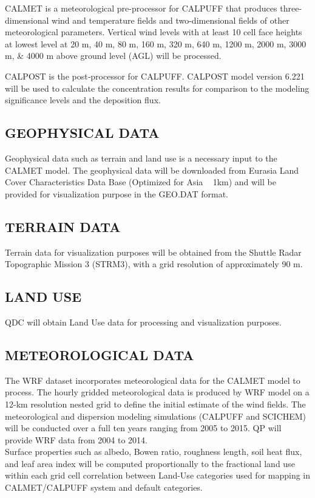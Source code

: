 CALMET is a meteorological pre-processor for CALPUFF that produces three‐dimensional wind and temperature fields and two-dimensional fields of other meteorological parameters. Vertical wind levels with at least 10 cell face heights at lowest level at 20 m, 40 m, 80 m, 160 m, 320 m, 640 m, 1200 m, 2000 m, 3000 m, \& 4000 m above ground level (AGL) will be processed. 

CALPOST is the post‐processor for CALPUFF. CALPOST model version 6.221 will be used to calculate the concentration results for comparison to the modeling significance levels and the deposition flux. 

\subsection{GEOPHYSICAL DATA}
Geophysical data such as terrain and land use is a necessary input to the CALMET model.  The geophysical data will be downloaded from Eurasia Land Cover Characteristics Data Base (Optimized for Asia ~ 1km) and will be provided for visualization purpose in the GEO.DAT format.
\subsection{TERRAIN DATA}
Terrain data for visualization purposes will be obtained from the Shuttle Radar Topographic Mission 3 (STRM3), with a grid resolution of approximately 90 m.

\subsection{LAND USE}
QDC will obtain Land Use data for processing and visualization purposes.

\subsection{METEOROLOGICAL DATA}
The WRF dataset incorporates meteorological data for the CALMET model to process. The hourly gridded meteorological data is produced by WRF model on a 12-km resolution nested grid to define the initial estimate of the wind fields. The meteorological and dispersion modeling simulations (CALPUFF and SCICHEM) will be conducted over a full ten years ranging from 2005 to 2015. QP will provide WRF data from 2004 to 2014.\\

Surface properties such as albedo, Bowen ratio, roughness length, soil heat flux, and leaf area index will be computed proportionally to the fractional land use within each grid cell correlation between Land-Use categories used for mapping in CALMET/CALPUFF system and default categories.\\

